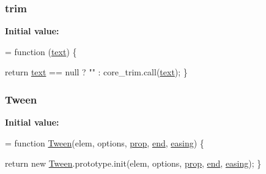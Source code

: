 \subsubsection[{\texorpdfstring{trim}{trim}}]{ trim}\hypertarget{jquery-2_82_81-vsdoc_8js_a5c6bdf61ecee84c4d51137801d3fac85}{}\label{jquery-2_82_81-vsdoc_8js_a5c6bdf61ecee84c4d51137801d3fac85}
{\bfseries Initial value\+:}
\begin{DoxyCode}
= \textcolor{keyword}{function} (\hyperlink{jquery-2_82_81-vsdoc_8js_aa5b77da29631a344064bb3d20c8702de}{text}) \{
        

        \textcolor{keywordflow}{return} \hyperlink{jquery-2_82_81-vsdoc_8js_aa5b77da29631a344064bb3d20c8702de}{text} == null ?
            \textcolor{stringliteral}{""} :
            core\_trim.call(\hyperlink{jquery-2_82_81-vsdoc_8js_aa5b77da29631a344064bb3d20c8702de}{text});
    \}
\end{DoxyCode}
\subsubsection[{\texorpdfstring{Tween}{Tween}}]{ Tween}\hypertarget{jquery-2_82_81-vsdoc_8js_a91e55267cc469e865a6a7c6cfc51c7b1}{}\label{jquery-2_82_81-vsdoc_8js_a91e55267cc469e865a6a7c6cfc51c7b1}
{\bfseries Initial value\+:}
\begin{DoxyCode}
= \textcolor{keyword}{function} \hyperlink{jquery-2_82_81-vsdoc_8js_a91e55267cc469e865a6a7c6cfc51c7b1}{Tween}(elem, options, \hyperlink{jquery-2_82_81-vsdoc_8js_af17be84954030af6c2286f5da385d41b}{prop}, \hyperlink{jquery-2_82_81-vsdoc_8js_af2ce7c86b4e6e9d61f85745258f4ef32}{end}, \hyperlink{jquery-2_82_81-vsdoc_8js_a9758a312629fa6de1744280dd6e6253b}{easing}) \{

        \textcolor{keywordflow}{return} \textcolor{keyword}{new} \hyperlink{jquery-2_82_81-vsdoc_8js_a91e55267cc469e865a6a7c6cfc51c7b1}{Tween}.prototype.init(elem, options, \hyperlink{jquery-2_82_81-vsdoc_8js_af17be84954030af6c2286f5da385d41b}{prop}, \hyperlink{jquery-2_82_81-vsdoc_8js_af2ce7c86b4e6e9d61f85745258f4ef32}{end}, 
      \hyperlink{jquery-2_82_81-vsdoc_8js_a9758a312629fa6de1744280dd6e6253b}{easing});
    \}
\end{DoxyCode}
